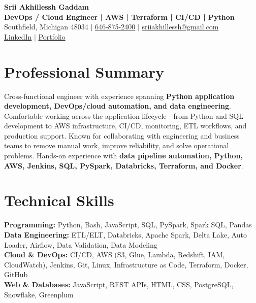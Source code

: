 \documentclass[letterpaper,10pt]{article}
\begin{document}
\fontsize{9.35pt}{10.45pt}\selectfont

\begin{center}
    {\LARGE \textbf{Srii Akhillessh Gaddam}} \\[-1pt]
    \textbf{DevOps / Cloud Engineer | AWS | Terraform | CI/CD | Python} \\[2pt]
    Southfield, Michigan 48034 $|$
    \href{tel:6468752400}{646-875-2400} $|$
    \href{mailto:sriiakhillessh@gmail.com}{sriiakhillessh@gmail.com} \\[1pt]
    \href{https://www.linkedin.com/in/srii-akhiilessh-gaddam-b48668191/}{LinkedIn} $|$
    \href{https://sriiakhillesshg.github.io/portfolio/}{Portfolio}
\end{center}
\vspace{-8pt}

\section{Professional Summary}
\small{Cross-functional engineer with experience spanning \textbf{Python application development, DevOps/cloud automation, and data engineering}. Comfortable working across the application lifecycle - from Python and SQL development to AWS infrastructure, CI/CD, monitoring, ETL workflows, and production support. Known for collaborating with engineering and business teams to remove manual work, improve reliability, and solve operational problems. Hands-on experience with \textbf{data pipeline automation, Python, AWS, Jenkins, SQL, PySpark, Databricks, Terraform, and Docker}.}

\section{Technical Skills}
\small{
\textbf{Programming:} Python, Bash, JavaScript, SQL, PySpark, Spark SQL, Pandas \\
\textbf{Data Engineering:} ETL/ELT, Databricks, Apache Spark, Delta Lake, Auto Loader, Airflow, Data Validation, Data Modeling \\
\textbf{Cloud \& DevOps:} CI/CD, AWS (S3, Glue, Lambda, Redshift, IAM, CloudWatch), Jenkins, Git, Linux, Infrastructure as Code, Terraform, Docker, GitHub \\
\textbf{Web \& Databases:} JavaScript, REST APIs, HTML, CSS, PostgreSQL, Snowflake, Greenplum
}
\end{document}
